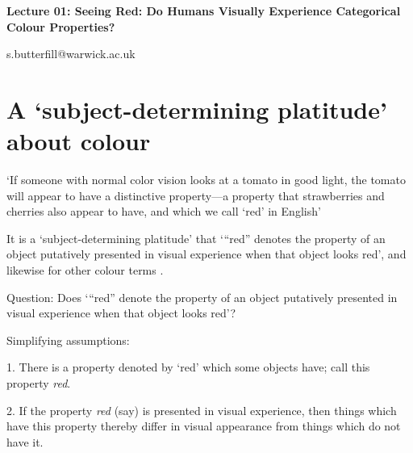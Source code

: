\documentclass[12pt]{extarticle}
\date{}
\makeatletter
\def \ititle {Origins of Mind}
\def \iemail{s.butterfill@warwick.ac.uk}
\makeatother
\begin{document}
\begin{multicols*}{3}

\setlength\footnotesep{1em}













\def \ititle {Lecture 01: Seeing Red: Do Humans Visually Experience Categorical Colour Properties?}

\begin{center}

{\Large

\textbf{\ititle}

}



\iemail %

\end{center}



\section{A ‘subject-determining platitude’ about colour}

‘If someone with normal color vision looks at a tomato in good light, the tomato will appear to have a distinctive property—a property that strawberries and cherries also appear to have, and which we call ‘red’ in English’ \citep[p.\ 4]{byrne:2003_color}

It is a ‘subject-determining platitude’
that ‘“red” denotes the property of an object putatively presented in visual experience
when that object looks red’, and likewise for other colour terms
\citep[pp.\ 199--200]{Jackson:1996zz}.

Question:
Does ‘“red” denote the property of an object putatively presented in visual experience when that object looks red’?


Simplifying assumptions:



1. There is a property denoted by ‘red’ which some objects have;  call this property   \emph{red}.


2. If the property \emph{red} (say) is presented in visual experience, then things which have this property  thereby differ in  visual appearance from things which do not have it.



\end{multicols*}
\end{document}
